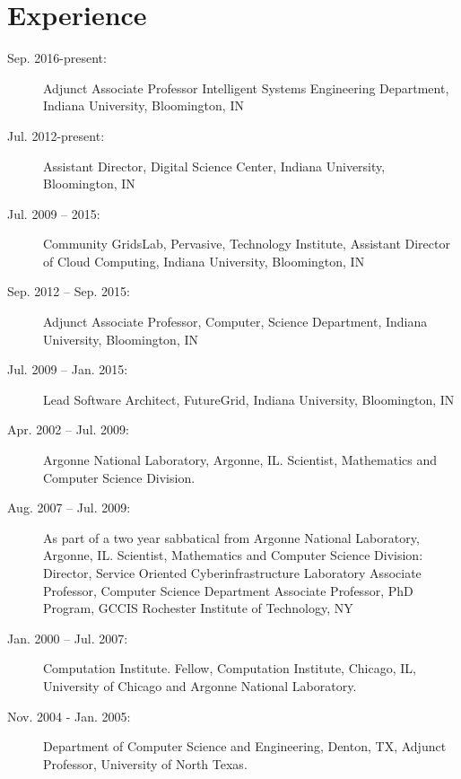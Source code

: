 \documentclass{article}
\begin{document}

\section{Experience}

\begin{description}

\item[Sep. 2016-present:]		Adjunct Associate Professor Intelligent Systems Engineering Department,  
				Indiana University, Bloomington, IN

\item[Jul. 2012-present:]		Assistant Director, Digital Science Center, Indiana University, 
Bloomington, IN


\item[Jul. 2009 – 2015:]		Community GridsLab, Pervasive, Technology Institute, Assistant Director of Cloud Computing, Indiana University, Bloomington, IN

\item[Sep. 2012 – Sep. 2015:]	 Adjunct Associate Professor, Computer, Science Department, Indiana   
				 University, Bloomington, IN

\item[Jul. 2009 – Jan. 2015:]	Lead Software Architect, FutureGrid, Indiana University, Bloomington, IN
\item[Apr. 2002 – Jul. 2009:] 	Argonne National Laboratory, Argonne, IL. Scientist, Mathematics
   				and Computer Science Division.

\item[Aug. 2007 – Jul. 2009:]	As part of a two year sabbatical from Argonne National Laboratory, Argonne,
 	IL. Scientist, Mathematics and Computer Science Division:
     Director, Service Oriented Cyberinfrastructure Laboratory
     Associate Professor, Computer Science Department
     Associate Professor, PhD Program, GCCIS
     Rochester Institute of Technology, NY 

\item[Jan. 2000 – Jul. 2007:]	Computation Institute. Fellow, Computation Institute, Chicago, IL, 
  	   			University of Chicago and Argonne National Laboratory. 

\item[Nov. 2004 - Jan. 2005:] 	Department of Computer Science and Engineering, Denton, TX,   
   				Adjunct Professor, University of North Texas. 


\end{description}
\end{document}
